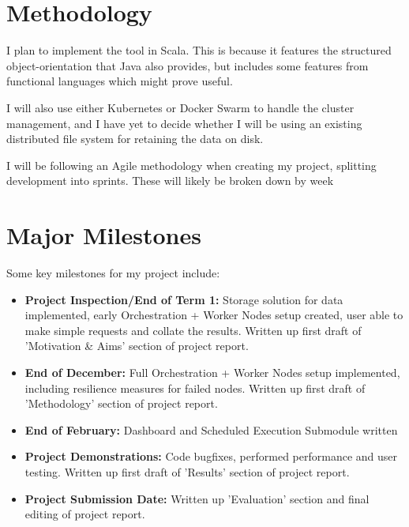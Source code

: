 \documentclass[12pt]{article}
\begin{document}
	\section{Methodology}
	I plan to implement the tool in Scala. This is because it features the structured object-orientation that Java also provides, but includes some features from functional languages which might prove useful. 
	
	I will also use either Kubernetes or Docker Swarm to handle the cluster management, and I have yet to decide whether I will be using an existing distributed file system for retaining the data on disk.
	
	I will be following an Agile methodology when creating my project, splitting development into sprints. These will likely be broken down by week
	
	\section{Major Milestones}
	Some key milestones for my project include:
	\begin{itemize}
		\item \textbf{Project Inspection/End of Term 1:} Storage solution for data implemented, early Orchestration + Worker Nodes setup created, user able to make simple requests and collate the results. Written up first draft of 'Motivation \& Aims' section of project report.
		\item \textbf{End of December:} Full Orchestration + Worker Nodes setup implemented, including resilience measures for failed nodes. Written up first draft of 'Methodology' section of project report.
		\item \textbf{End of February:} Dashboard and Scheduled Execution Submodule written
		\item \textbf{Project Demonstrations:} Code bugfixes, performed performance and user testing. Written up first draft of 'Results' section of project report.
		\item \textbf{Project Submission Date:} Written up 'Evaluation' section and final editing of project report.
	\end{itemize}
	
	
\end{document}
